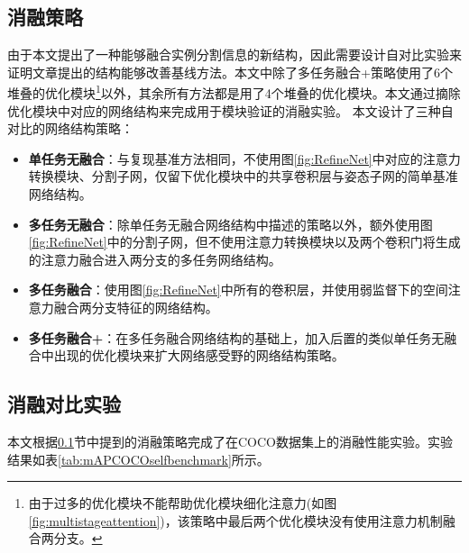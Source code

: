 \subsection{消融策略}
\label{subsec:selfstrategy}
由于本文提出了一种能够融合实例分割信息的新结构，因此需要设计自对比实验来证明文章提出的结构能够改善基线方法。本文中除了多任务融合+策略使用了6个堆叠的优化模块\footnote{由于过多的优化模块不能帮助优化模块细化注意力(如图\ref{fig:multistageattention})，该策略中最后两个优化模块没有使用注意力机制融合两分支。}以外，其余所有方法都是用了4个堆叠的优化模块。本文通过摘除优化模块中对应的网络结构来完成用于模块验证的消融实验。
本文设计了三种自对比的网络结构策略：
\begin{itemize}
	\item \textbf{单任务无融合}：与复现基准方法相同，不使用图\ref{fig:RefineNet}中对应的注意力转换模块、分割子网，仅留下优化模块中的共享卷积层与姿态子网的简单基准网络结构。
	\item \textbf{多任务无融合}：除单任务无融合网络结构中描述的策略以外，额外使用图\ref{fig:RefineNet}中的分割子网，但不使用注意力转换模块以及两个卷积门将生成的注意力融合进入两分支的多任务网络结构。
	\item \textbf{多任务融合}：使用图\ref{fig:RefineNet}中所有的卷积层，并使用弱监督下的空间注意力融合两分支特征的网络结构。
	\item \textbf{多任务融合+}：在多任务融合网络结构的基础上，加入后置的类似单任务无融合中出现的优化模块来扩大网络感受野的网络结构策略。
\end{itemize}

\subsection{消融对比实验}
\label{subsec:selfeval}

本文根据\ref{subsec:selfstrategy}节中提到的消融策略完成了在COCO数据集上的消融性能实验。实验结果如表\ref{tab:mAPCOCOselfbenchmark}所示。

